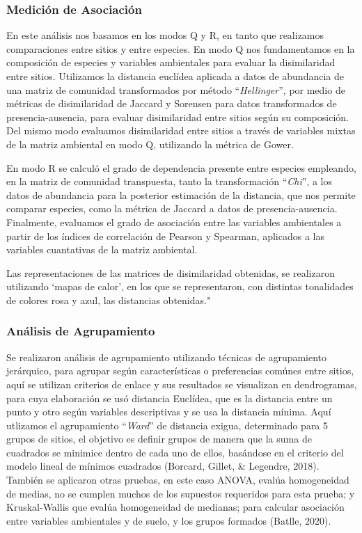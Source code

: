 \documentclass[11pt,]{article}
\begin{document}
\subsubsection{Medición de
Asociación}\label{mediciuxf3n-de-asociaciuxf3n}

En este análisis nos basamos en los modos Q y R, en tanto que realizamos
comparaciones entre sitios y entre especies. En modo Q nos fundamentamos
en la composición de especies y variables ambientales para evaluar la
disimilaridad entre sitios. Utilizamos la distancia euclídea aplicada a
datos de abundancia de una matriz de comunidad transformados por método
``\emph{Hellinger}'', por medio de métricas de disimilaridad de Jaccard
y Sorensen para datos transformados de presencia-ausencia, para evaluar
disimilaridad entre sitios según su composición. Del mismo modo
evaluamos disimilaridad entre sitios a través de variables mixtas de la
matriz ambiental en modo Q, utilizando la métrica de Gower.

En modo R se calculó el grado de dependencia presente entre especies
empleando, en la matriz de comunidad transpuesta, tanto la
transformación ``\emph{Chi}'', a los datos de abundancia para la
posterior estimación de la distancia, que nos permite comparar especies,
como la métrica de Jaccard a datos de presencia-ausencia. Finalmente,
evaluamos el grado de asociación entre las variables ambientales a
partir de los índices de correlación de Pearson y Spearman, aplicados a
las variables cuantativas de la matriz ambiental.

Las representaciones de las matrices de disimilaridad obtenidas, se
realizaron utilizando `mapas de calor', en los que se representaron, con
distintas tonalidades de colores rosa y azul, las distancias obtenidas."

\subsubsection{Análisis de
Agrupamiento}\label{anuxe1lisis-de-agrupamiento}

Se realizaron análisis de agrupamiento utilizando técnicas de
agrupamiento jerárquico, para agrupar según características o
preferencias comúnes entre sitios, aquí se utilizan criterios de enlace
y sus resultados se visualizan en dendrogramas, para cuya elaboración se
usó distancia Euclídea, que es la distancia entre un punto y otro según
variables descriptivas y se usa la distancia mínima. Aquí utlizamos el
agrupamiento ``\emph{Ward}'' de distancia exigua, determinado para 5
grupos de sitios, el objetivo es definir grupos de manera que la suma de
cuadrados se minimice dentro de cada uno de ellos, basándose en el
criterio del modelo lineal de mínimos cuadrados (Borcard, Gillet, \&
Legendre, 2018). También se aplicaron otras pruebas, en este caso ANOVA,
evalúa homogeneidad de medias, no se cumplen muchos de los supuestos
requeridos para esta prueba; y Kruskal-Wallis que evalúa homogeneidad de
medianas; para calcular asociación entre variables ambientales y de
suelo, y los grupos formados (Batlle, 2020).
\end{document}
